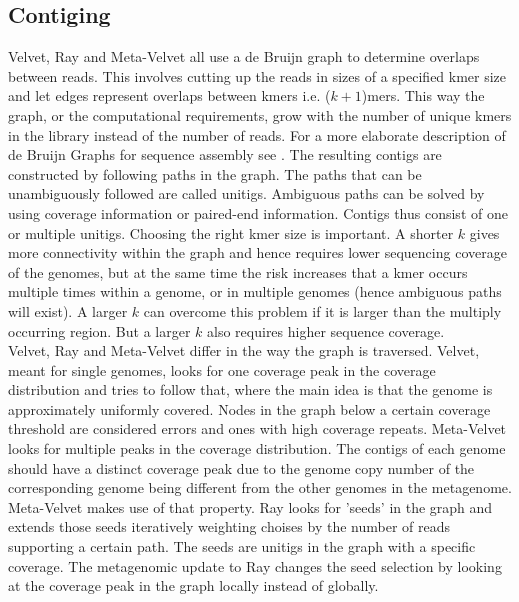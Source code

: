 \subsection*{Contiging}
Velvet, Ray and Meta-Velvet all use a de Bruijn graph to determine overlaps
between reads. This involves cutting up the reads in sizes of a specified kmer
size and let edges represent overlaps between kmers i.e. ($k+1$)mers. This way
the graph, or the computational requirements, grow with the number of unique
kmers in the library instead of the number of reads. For a more elaborate
description of de Bruijn Graphs for sequence assembly see
\cite{Miller20211242}. The resulting contigs are constructed by following paths
in the graph. The paths that can be unambiguously followed are called unitigs.
Ambiguous paths can be solved by using coverage information or paired-end
information. Contigs thus consist of one or multiple unitigs. Choosing the
right kmer size is important. A shorter $k$ gives more connectivity within the
graph and hence requires lower sequencing coverage of the genomes, but at the
same time the risk increases that a kmer occurs multiple times within a genome,
or in multiple genomes (hence ambiguous paths will exist). A larger $k$ can
overcome this problem if it is larger than the multiply occurring region. But a
larger $k$ also requires higher sequence coverage.\\


Velvet, Ray and Meta-Velvet differ in the way the graph is traversed. Velvet,
meant for single genomes, looks for one coverage peak in the coverage
distribution and tries to follow that, where the main idea is that the genome
is approximately uniformly covered. Nodes in the graph below a certain coverage
threshold are considered errors and ones with high coverage repeats.
Meta-Velvet looks for multiple peaks in the coverage distribution. The contigs
of each genome should have a distinct coverage peak due to the genome copy
number of the corresponding genome being different from the other genomes in
the metagenome. Meta-Velvet makes use of that property. Ray looks for 'seeds'
in the graph and extends those seeds iteratively weighting choises by the
number of reads supporting a certain path. The seeds are unitigs in the graph
with a specific coverage. The metagenomic update to Ray changes the seed
selection by looking at the coverage peak in the graph locally instead of
globally. 


